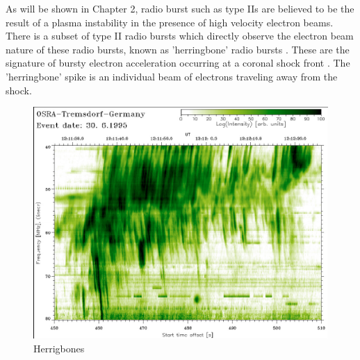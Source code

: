 As will be shown in Chapter 2, radio burst such as type IIs are believed to be the result of a plasma instability in the presence of high velocity electron beams. There is a subset of type II radio bursts which directly observe the electron beam nature of these radio bursts, known as 'herringbone' radio bursts \citep{cairns1987, cane1998}. These are the signature of bursty electron acceleration occurring at a coronal shock front \citep{mann2005}. The 'herringbone' spike is an individual beam of electrons traveling away from the shock. 
\begin{figure}[!t]
\begin{center}
\includegraphics[scale=1.4]{images/miteva_herbones.pdf}
\caption{Herrigbones}
\end{center}
\label{fig:herringbones}
\end{figure}

